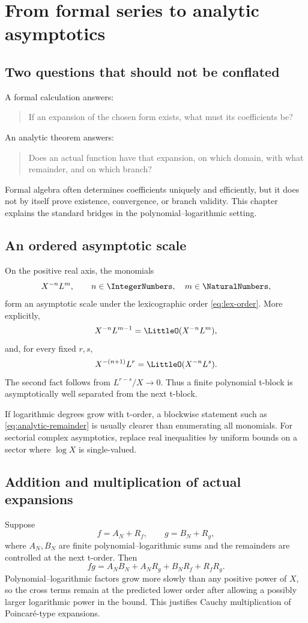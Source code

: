 \documentclass[11pt,openany]{book}
\theoremstyle{definition}
\theoremstyle{plain}
\theoremstyle{remark}
\begin{document}
\chapter{From formal series to analytic asymptotics}\label{ch:analytic}

\section{Two questions that should not be conflated}
A formal calculation answers:
\begin{quote}
If an expansion of the chosen form exists, what must its coefficients be?
\end{quote}
An analytic theorem answers:
\begin{quote}
Does an actual function have that expansion, on which domain, with what
remainder, and on which branch?
\end{quote}
Formal algebra often determines coefficients uniquely and efficiently, but it
does not by itself prove existence, convergence, or branch validity.  This
chapter explains the standard bridges in the polynomial--logarithmic setting.

\section{An ordered asymptotic scale}
On the positive real axis, the monomials
\[
 X^{-n}L^m,
 \qquad n\in\IntegerNumbers,
 \quad m\in\NaturalNumbers,
\]
form an asymptotic scale under the lexicographic order
\cref{eq:lex-order}.  More explicitly,
\[
 X^{-n}L^{m-1}=\LittleO(X^{-n}L^m),
\]
and, for every fixed \(r,s\),
\[
 X^{-(n+1)}L^r=\LittleO(X^{-n}L^s).
\]
The second fact follows from
\(L^{r-s}/X\to0\).  Thus a finite polynomial t-block is asymptotically
well separated from the next t-block.

If logarithmic degrees grow with t-order, a blockwise statement such as
\cref{eq:analytic-remainder} is usually clearer than enumerating all monomials.
For sectorial complex asymptotics, replace real inequalities by uniform bounds
on a sector where \(\log X\) is single-valued.

\section{Addition and multiplication of actual expansions}
Suppose
\[
 f=A_N+R_f,
 \qquad
 g=B_N+R_g,
\]
where \(A_N,B_N\) are finite polynomial--logarithmic sums and the remainders
are controlled at the next t-order.  Then
\[
 fg=A_NB_N+A_NR_g+B_NR_f+R_fR_g.
\]
Polynomial--logarithmic factors grow more slowly than any positive power of
\(X\), so the cross terms remain at the predicted lower order after allowing a
possibly larger logarithmic power in the bound.  This justifies Cauchy
multiplication of Poincaré-type expansions.
\end{document}
